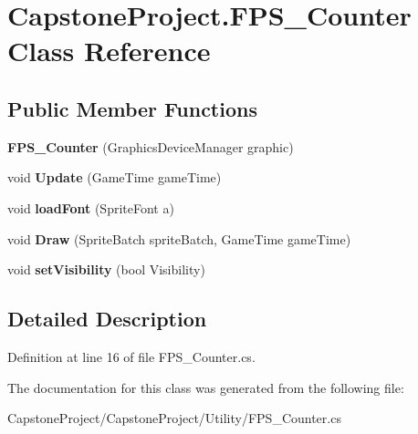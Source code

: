 \hypertarget{class_capstone_project_1_1_f_p_s___counter}{\section{Capstone\-Project.\-F\-P\-S\-\_\-\-Counter Class Reference}
\label{class_capstone_project_1_1_f_p_s___counter}
}
\subsection*{Public Member Functions}
\begin{DoxyCompactItemize}
\item 
\hypertarget{class_capstone_project_1_1_f_p_s___counter_aa4b311b83d71702793af770f35665d5a}{{\bfseries F\-P\-S\-\_\-\-Counter} (Graphics\-Device\-Manager graphic)}\label{class_capstone_project_1_1_f_p_s___counter_aa4b311b83d71702793af770f35665d5a}

\item 
\hypertarget{class_capstone_project_1_1_f_p_s___counter_a50971dd7f5656005f2a80707874bc800}{void {\bfseries Update} (Game\-Time game\-Time)}\label{class_capstone_project_1_1_f_p_s___counter_a50971dd7f5656005f2a80707874bc800}

\item 
\hypertarget{class_capstone_project_1_1_f_p_s___counter_af4dcf397acb8bfae9118af5680ef8948}{void {\bfseries load\-Font} (Sprite\-Font a)}\label{class_capstone_project_1_1_f_p_s___counter_af4dcf397acb8bfae9118af5680ef8948}

\item 
\hypertarget{class_capstone_project_1_1_f_p_s___counter_a42a19fb80b83ed33fbaf92db753d837b}{void {\bfseries Draw} (Sprite\-Batch sprite\-Batch, Game\-Time game\-Time)}\label{class_capstone_project_1_1_f_p_s___counter_a42a19fb80b83ed33fbaf92db753d837b}

\item 
\hypertarget{class_capstone_project_1_1_f_p_s___counter_a2efed39113c7db14ed5b9a867b6412bd}{void {\bfseries set\-Visibility} (bool Visibility)}\label{class_capstone_project_1_1_f_p_s___counter_a2efed39113c7db14ed5b9a867b6412bd}

\end{DoxyCompactItemize}


\subsection{Detailed Description}


Definition at line 16 of file F\-P\-S\-\_\-\-Counter.\-cs.



The documentation for this class was generated from the following file\-:\begin{DoxyCompactItemize}
\item 
Capstone\-Project/\-Capstone\-Project/\-Utility/F\-P\-S\-\_\-\-Counter.\-cs\end{DoxyCompactItemize}
